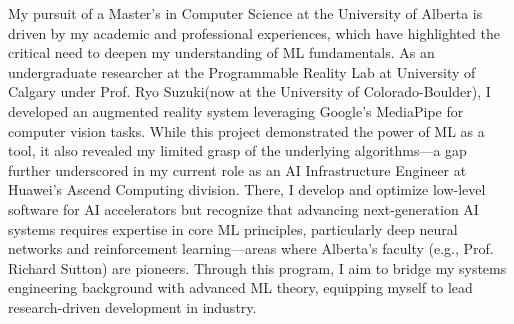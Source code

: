 \documentclass{article}
\newcommand{\school}{University of Alberta\xspace}
\begin{document}


My pursuit of a Master's in Computer Science at the University of Alberta is driven by my academic and professional experiences, which have highlighted the critical need to deepen my understanding of ML fundamentals. As an undergraduate researcher at the Programmable Reality Lab at University of Calgary under Prof. Ryo Suzuki(now at the University of Colorado-Boulder), I developed an augmented reality system leveraging Google's MediaPipe for computer vision tasks. While this project demonstrated the power of ML as a tool, it also revealed my limited grasp of the underlying algorithms—a gap further underscored in my current role as an AI Infrastructure Engineer at Huawei's Ascend Computing division. There, I develop and optimize low-level software for AI accelerators but recognize that advancing next-generation AI systems requires expertise in core ML principles, particularly deep neural networks and reinforcement learning—areas where Alberta's faculty (e.g., Prof. Richard Sutton) are pioneers. Through this program, I aim to bridge my systems engineering background with advanced ML theory, equipping myself to lead research-driven development in industry.
\end{document}
